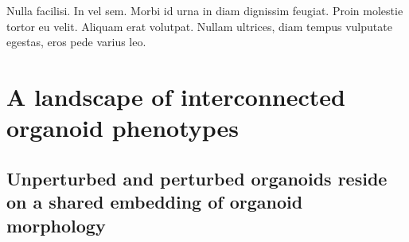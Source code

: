 \begin{savequote}[75mm]
Nulla facilisi. In vel sem. Morbi id urna in diam dignissim feugiat. Proin molestie tortor eu velit. Aliquam erat volutpat. Nullam ultrices, diam tempus vulputate egestas, eros pede varius leo.
\end{savequote}

\chapter{A landscape of interconnected organoid phenotypes}

\section{Unperturbed and perturbed organoids reside on a shared embedding of organoid morphology}

